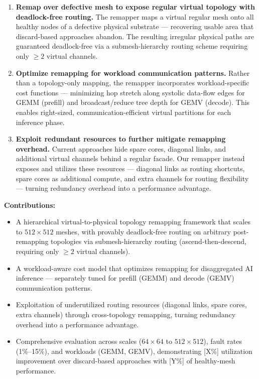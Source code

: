 \documentclass[sigplan,anonymous,review,nonacm]{acmart}
\begin{document}
\begin{enumerate}
\item \textbf{Remap over defective mesh to expose regular virtual topology with deadlock-free routing.}
The remapper maps a virtual regular mesh onto all healthy nodes of a defective physical substrate --- recovering usable area that discard-based approaches abandon. The resulting irregular physical paths are guaranteed deadlock-free via a submesh-hierarchy routing scheme requiring only ${\geq}2$ virtual channels.

\item \textbf{Optimize remapping for workload communication patterns.}
Rather than a topology-only mapping, the remapper incorporates workload-specific cost functions --- minimizing hop stretch along systolic data-flow edges for GEMM (prefill) and broadcast/reduce tree depth for GEMV (decode). This enables right-sized, communication-efficient virtual partitions for each inference phase.

\item \textbf{Exploit redundant resources to further mitigate remapping overhead.}
Current approaches hide spare cores, diagonal links, and additional virtual channels behind a regular facade. Our remapper instead exposes and utilizes these resources --- diagonal links as routing shortcuts, spare cores as additional compute, and extra channels for routing flexibility --- turning redundancy overhead into a performance advantage.
\end{enumerate}

\noindent\textbf{Contributions:}
\begin{itemize}
\item A hierarchical virtual-to-physical topology remapping framework that scales to $512 \times 512$ meshes, with provably deadlock-free routing on arbitrary post-remapping topologies via submesh-hierarchy routing (ascend-then-descend, requiring only ${\geq}2$ virtual channels).

\item A workload-aware cost model that optimizes remapping for disaggregated AI inference --- separately tuned for prefill (GEMM) and decode (GEMV) communication patterns.

\item Exploitation of underutilized routing resources (diagonal links, spare cores, extra channels) through cross-topology remapping, turning redundancy overhead into a performance advantage.

\item Comprehensive evaluation across scales ($64 \times 64$ to $512 \times 512$), fault rates (1\%--15\%), and workloads (GEMM, GEMV), demonstrating [X\%] utilization improvement over discard-based approaches with [Y\%] of healthy-mesh performance.
\end{itemize}
\end{document}
